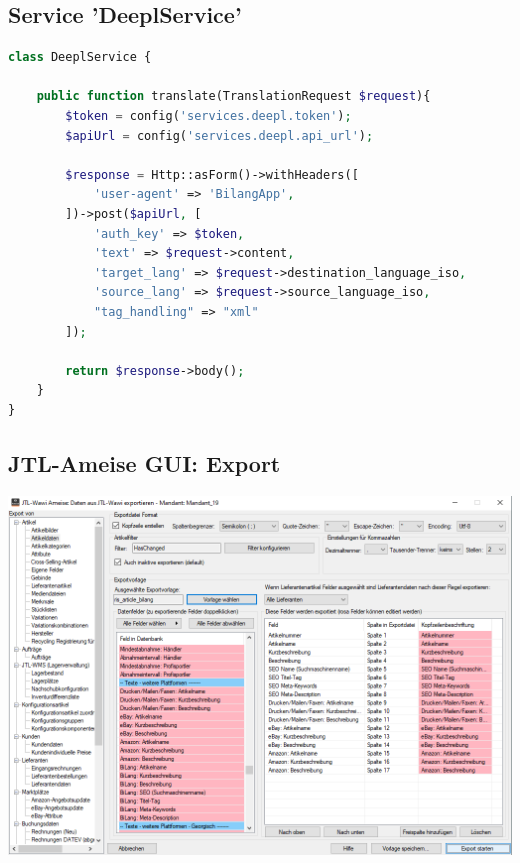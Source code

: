 \newpage
\subsection{Service 'DeeplService'}
\label{sec:deeplservice}
\begin{lstlisting}[language=php]
class DeeplService {

    public function translate(TranslationRequest $request){
        $token = config('services.deepl.token');
        $apiUrl = config('services.deepl.api_url');
        
        $response = Http::asForm()->withHeaders([
            'user-agent' => 'BilangApp',
        ])->post($apiUrl, [
            'auth_key' => $token, 
            'text' => $request->content, 
            'target_lang' => $request->destination_language_iso, 
            'source_lang' => $request->source_language_iso, 
            "tag_handling" => "xml"
        ]);
        
        return $response->body();
    }
}
\end{lstlisting}

\subsection{JTL-Ameise GUI: Export}
\label{sec:ameise}
\includegraphics[width=15cm]{./img/AmeiseExport.png}

\newpage
